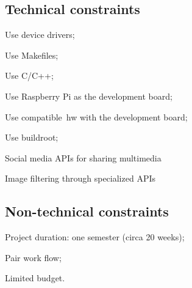 \subsection{Technical constraints}
\label{sec:techn-constr}
%
\begin{item-c}
\item Use device drivers;
\item Use Makefiles;
\item Use C/C++;
\item Use Raspberry Pi as the development board;
\item Use compatible~\gls{hw} with the development board;
\item Use buildroot;
\item Social media APIs for sharing multimedia
\item Image filtering through specialized APIs
\end{item-c}
\subsection{Non-technical constraints}
\label{sec:non-techn-constr}

\begin{item-c}
\item Project duration: one semester (circa 20 weeks); 
\item Pair work flow;
\item Limited budget.
\end{item-c}

